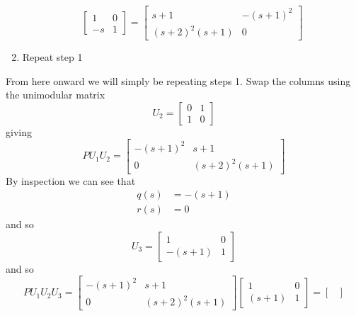 \begin{example}
\begin{enumerate}
\begin{equation*}
      \begin{bmatrix}
        1 & 0 \\
        -s & 1
      \end{bmatrix}
      =
      \begin{bmatrix}
        s+1 & -(s+1)^{2} \\
        (s+2)^{2}(s+1) & 0
      \end{bmatrix}
    \end{equation*}
    \item{Repeat step 1}
  \end{enumerate}
  From here onward we will simply be repeating steps 1.
  Swap the columns using the unimodular matrix
  \begin{equation*}
    U_{2}=
    \begin{bmatrix}
      0 & 1 \\
      1 & 0
    \end{bmatrix}
  \end{equation*}
  giving
  \begin{equation*}
    PU_{1}U_{2}=
    \begin{bmatrix}
      -(s+1)^{2} & s+1\\
      0 & (s+2)^{2}(s+1)
    \end{bmatrix}
  \end{equation*}
  By inspection we can see that
  \begin{equation*}
    \begin{split}
      q(s)&=-(s+1) \\
      r(s)&=0
    \end{split}
  \end{equation*}
  and so
  \begin{equation*}
    U_{3}=
    \begin{bmatrix}
      1 & 0 \\
      -(s+1) & 1
    \end{bmatrix}
  \end{equation*}
  and so
  \begin{equation*}
    PU_{1}U_{2}U_{3}=
    \begin{bmatrix}
      -(s+1)^{2} & s+1 \\
      0 & (s+2)^{2}(s+1)
    \end{bmatrix}
    \begin{bmatrix}
      1 & 0 \\
      (s+1) & 1
    \end{bmatrix}
    =
    \begin{bmatrix}

\end{bmatrix}
\end{equation*}
\end{example}
